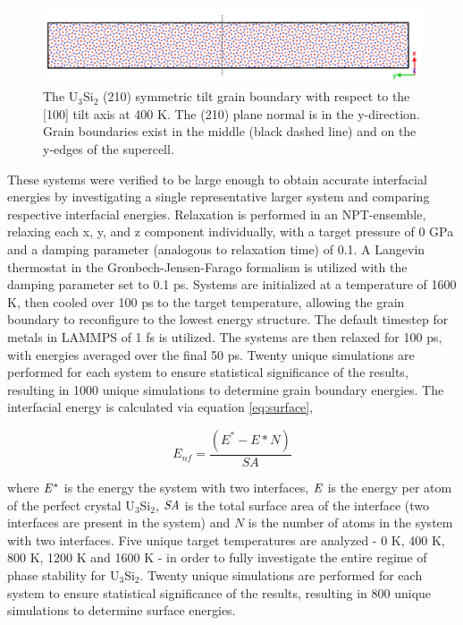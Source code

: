 \documentclass[review]{elsarticle}
\begin{document}
\begin{figure}[h]
 \centering
 \includegraphics[width=1.0\textwidth]{gbex.png} 
 \caption{The U$_{3}$Si$_{2}$ (210) symmetric tilt grain boundary with respect to the [100] tilt axis at 400 K. The (210) plane normal is in the y-direction. Grain boundaries exist in the middle (black dashed line) and on the y-edges of the supercell. }
 \label{fig:gbex}
\end{figure}

These systems were verified to be large enough to obtain accurate interfacial energies by investigating a single representative larger system and comparing respective interfacial energies. Relaxation is performed in an NPT-ensemble, relaxing each x, y, and z component individually, with a target pressure of 0 GPa and a damping parameter (analogous to relaxation time) of 0.1. A Langevin thermostat in the Gronbech-Jensen-Farago \cite{gjf2014} formalism is utilized with the damping parameter set to 0.1 ps. Systems are initialized at a temperature of 1600 K, then cooled over 100 ps to the target temperature, allowing the grain boundary to reconfigure to the lowest energy structure. The default timestep for metals in LAMMPS of 1 fs is utilized. The systems are then relaxed for 100 ps, with energies averaged over the final 50 ps. Twenty unique simulations are performed for each system to ensure statistical significance of the results, resulting in 1000 unique simulations to determine grain boundary energies. The interfacial energy is calculated via equation \ref{eq:surface},

\begin{equation}
\label{eq:surface}
E_{nf}= \frac{(E^{*} - E*N)}{SA}
\end{equation}

where $\it{E^{*}}$ is the energy the system with two interfaces, $\it{E}$ is the energy per atom of the perfect crystal U$_{3}$Si$_{2}$, $\it{SA}$ is the total surface area of the interface (two interfaces are present in the system) and $\textit{N}$ is the number of atoms in the system with two interfaces. Five unique target temperatures are analyzed - 0 K, 400 K, 800 K, 1200 K and 1600 K - in order to fully investigate the entire regime of phase stability for U$_{3}$Si$_{2}$. Twenty unique simulations are performed for each system to ensure statistical significance of the results, resulting in 800 unique simulations to determine surface energies.
\end{document}
